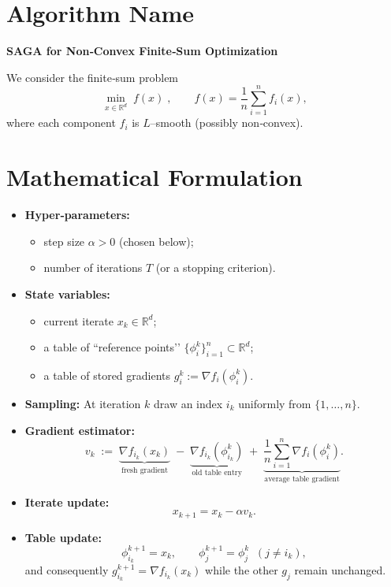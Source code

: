 \documentclass{article}
\newcommand{\R}{\mathbb{R}}
\begin{document}
\section*{Algorithm Name}
\textbf{SAGA for Non‑Convex Finite‑Sum Optimization}  

We consider the finite‑sum problem  
\[
\min_{x\in\R^{d}} \; f(x)\;,\qquad 
f(x)=\frac1n\sum_{i=1}^{n} f_i(x),
\]
where each component $f_i$ is $L$–smooth (possibly non‑convex).

\section*{Mathematical Formulation}
\begin{itemize}
    \item \textbf{Hyper‑parameters:}
    \begin{itemize}
        \item step size $\alpha>0$ (chosen below);
        \item number of iterations $T$ (or a stopping criterion).
    \end{itemize}
    \item \textbf{State variables:}
    \begin{itemize}
        \item current iterate $x_k\in\R^{d}$;
        \item a table of “reference points’’ $\{\phi_i^k\}_{i=1}^{n}\subset\R^{d}$;
        \item a table of stored gradients $g_i^k:=\nabla f_i(\phi_i^k)$.
    \end{itemize}
    \item \textbf{Sampling:} At iteration $k$ draw an index $i_k$ uniformly from $\{1,\dots,n\}$.
    \item \textbf{Gradient estimator:}
    \[
    v_k \;:=\; \underbrace{\nabla f_{i_k}(x_k)}_{\text{fresh gradient}}
          \;-\; \underbrace{\nabla f_{i_k}(\phi_{i_k}^k)}_{\text{old table entry}}
          \;+\; \underbrace{\frac1n\sum_{i=1}^{n}\nabla f_i(\phi_i^k)}_{\text{average table gradient}}.
    \tag{1}
    \]
    \item \textbf{Iterate update:}
    \[
    x_{k+1}=x_k-\alpha v_k . \tag{2}
    \]
    \item \textbf{Table update:}
    \[
    \phi_{i_k}^{k+1}=x_k,\qquad 
    \phi_{j}^{k+1}=\phi_{j}^{k}\;\;(j\neq i_k), \tag{3}
    \]
    and consequently $g_{i_k}^{k+1}=\nabla f_{i_k}(x_k)$ while the other
    $g_j$ remain unchanged.
\end{itemize}
\end{document}
